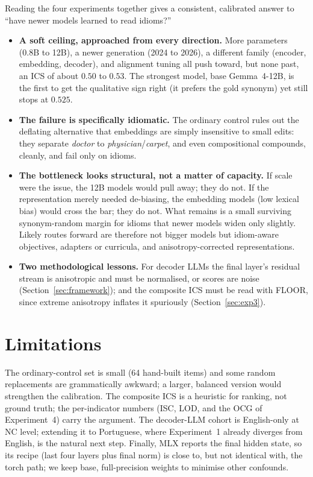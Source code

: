 \documentclass[11pt]{article}
\begin{document}
Reading the four experiments together gives a consistent, calibrated answer to ``have newer models
learned to read idioms?''
\begin{itemize}
  \item \textbf{A soft ceiling, approached from every direction.} More parameters (0.8B to 12B), a
  newer generation (2024 to 2026), a different family (encoder, embedding, decoder), and alignment
  tuning all push toward, but none past, an ICS of about $0.50$ to $0.53$. The strongest model, base
  Gemma~4-12B, is the first to get the qualitative sign right (it prefers the gold synonym) yet still
  stops at $0.525$.
  \item \textbf{The failure is specifically idiomatic.} The ordinary control rules out the deflating
  alternative that embeddings are simply insensitive to small edits: they separate \emph{doctor} to
  \emph{physician}/\emph{carpet}, and even compositional compounds, cleanly, and fail only on idioms.
  \item \textbf{The bottleneck looks structural, not a matter of capacity.} If scale were the issue,
  the 12B models would pull away; they do not. If the representation merely needed de-biasing, the
  embedding models (low lexical bias) would cross the bar; they do not. What remains is a small
  surviving synonym-random margin for idioms that newer models widen only slightly. Likely routes
  forward are therefore not bigger models but idiom-aware objectives, adapters or curricula, and
  anisotropy-corrected representations.
  \item \textbf{Two methodological lessons.} For decoder LLMs the final layer's residual stream is
  anisotropic and must be normalised, or scores are noise (Section~\ref{sec:framework}); and the
  composite ICS must be read with FLOOR, since extreme anisotropy inflates it spuriously
  (Section~\ref{sec:exp3}).
\end{itemize}

\section{Limitations}

The ordinary-control set is small (64 hand-built items) and some random replacements are
grammatically awkward; a larger, balanced version would strengthen the calibration. The composite ICS
is a heuristic for ranking, not ground truth; the per-indicator numbers (ISC, LOD, and the OCG of
Experiment~4) carry the argument. The decoder-LLM cohort is English-only at NC level; extending it to
Portuguese, where Experiment~1 already diverges from English, is the natural next step. Finally, MLX
reports the final hidden state, so its recipe (last four layers plus final norm) is close to, but not
identical with, the torch path; we keep base, full-precision weights to minimise other confounds.
\end{document}
